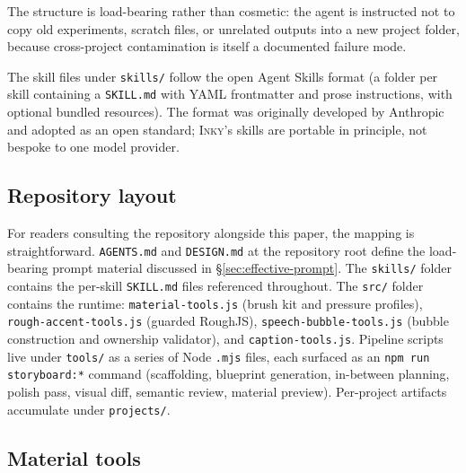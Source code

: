 \documentclass[10pt,twocolumn]{article}
\newcommand{\inky}{\textsc{Inky}}
\begin{document}
\noindent
The structure is load-bearing rather than cosmetic: the agent is
instructed not to copy old experiments, scratch files, or unrelated
outputs into a new project folder, because cross-project contamination
is itself a documented failure mode.

The skill files under \texttt{skills/} follow the open Agent
Skills format (a folder per skill containing a \texttt{SKILL.md}
with YAML frontmatter and prose instructions, with optional
bundled resources). The format was originally developed by
Anthropic and adopted as an open standard; \inky{}'s skills are
portable in principle, not bespoke to one model provider.

\subsection{Repository layout}

For readers consulting the repository alongside this paper, the
mapping is straightforward. \texttt{AGENTS.md} and \texttt{DESIGN.md}
at the repository root define the load-bearing prompt material
discussed in \S\ref{sec:effective-prompt}. The
\texttt{skills/} folder contains the per-skill \texttt{SKILL.md}
files referenced throughout. The \texttt{src/} folder contains the
runtime: \texttt{material-tools.js} (brush kit and pressure
profiles), \texttt{rough-accent-tools.js} (guarded RoughJS),
\texttt{speech-bubble-tools.js} (bubble construction and
ownership validator), and \texttt{caption-tools.js}. Pipeline
scripts live under \texttt{tools/} as a series of Node \texttt{.mjs}
files, each surfaced as an \texttt{npm run storyboard:*} command
(scaffolding, blueprint generation, in-between planning, polish
pass, visual diff, semantic review, material preview).
Per-project artifacts accumulate under \texttt{projects/}.

\subsection{Material tools}
\end{document}
